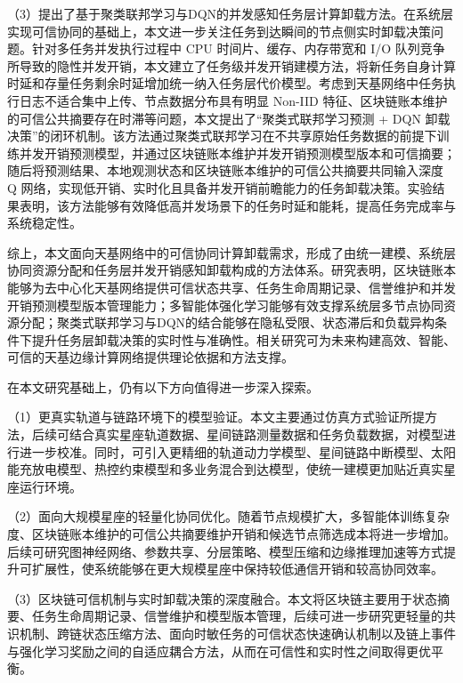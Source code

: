 （3）提出了基于聚类联邦学习与DQN的并发感知任务层计算卸载方法。在系统层实现可信协同的基础上，本文进一步关注任务到达瞬间的节点侧实时卸载决策问题。针对多任务并发执行过程中 CPU 时间片、缓存、内存带宽和 I/O 队列竞争所导致的隐性并发开销，本文建立了任务级并发开销建模方法，将新任务自身计算时延和存量任务剩余时延增加统一纳入任务层代价模型。考虑到天基网络中任务执行日志不适合集中上传、节点数据分布具有明显 Non-IID 特征、区块链账本维护的可信公共摘要存在时滞等问题，本文提出了“聚类式联邦学习预测 + DQN 卸载决策”的闭环机制。该方法通过聚类式联邦学习在不共享原始任务数据的前提下训练并发开销预测模型，并通过区块链账本维护并发开销预测模型版本和可信摘要；随后将预测结果、本地观测状态和区块链账本维护的可信公共摘要共同输入深度 Q 网络，实现低开销、实时化且具备并发开销前瞻能力的任务卸载决策。实验结果表明，该方法能够有效降低高并发场景下的任务时延和能耗，提高任务完成率与系统稳定性。

综上，本文面向天基网络中的可信协同计算卸载需求，形成了由统一建模、系统层协同资源分配和任务层并发开销感知卸载构成的方法体系。研究表明，区块链账本能够为去中心化天基网络提供可信状态共享、任务生命周期记录、信誉维护和并发开销预测模型版本管理能力；多智能体强化学习能够有效支撑系统层多节点协同资源分配；聚类式联邦学习与DQN的结合能够在隐私受限、状态滞后和负载异构条件下提升任务层卸载决策的实时性与准确性。相关研究可为未来构建高效、智能、可信的天基边缘计算网络提供理论依据和方法支撑。

在本文研究基础上，仍有以下方向值得进一步深入探索。

（1）更真实轨道与链路环境下的模型验证。本文主要通过仿真方式验证所提方法，后续可结合真实星座轨道数据、星间链路测量数据和任务负载数据，对模型进行进一步校准。同时，可引入更精细的轨道动力学模型、星间链路中断模型、太阳能充放电模型、热控约束模型和多业务混合到达模型，使统一建模更加贴近真实星座运行环境。

（2）面向大规模星座的轻量化协同优化。随着节点规模扩大，多智能体训练复杂度、区块链账本维护的可信公共摘要维护开销和候选节点筛选成本将进一步增加。后续可研究图神经网络、参数共享、分层策略、模型压缩和边缘推理加速等方式提升可扩展性，使系统能够在更大规模星座中保持较低通信开销和较高协同效率。

（3）区块链可信机制与实时卸载决策的深度融合。本文将区块链主要用于状态摘要、任务生命周期记录、信誉维护和模型版本管理，后续可进一步研究更轻量的共识机制、跨链状态压缩方法、面向时敏任务的可信状态快速确认机制以及链上事件与强化学习奖励之间的自适应耦合方法，从而在可信性和实时性之间取得更优平衡。
